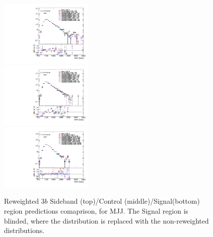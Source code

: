 \begin{figure}[htbp!]
\begin{center}
\includegraphics[angle=270, width=0.4\textwidth]{./figures/boosted/AppendixReweight/Compare/Data_ThreeTag_Sideband_directcompare_mHH_l_1.pdf}\\
\includegraphics[angle=270, width=0.4\textwidth]{./figures/boosted/AppendixReweight/Compare/Data_ThreeTag_Control_directcompare_mHH_l_1.pdf}\\
\includegraphics[angle=270, width=0.4\textwidth]{./figures/boosted/AppendixReweight/Compare/Data_ThreeTag_Signal_directcompare_mHH_l_1.pdf}
\caption{Reweighted 3$b$ Sideband (top)/Control (middle)/Signal(bottom) region predictions comaprison, for MJJ. The Signal region is blinded, where the distribution is replaced with the non-reweighted distributions.}
\label{fig:app-rw-comp-3b}
\end{center}
\end{figure}

